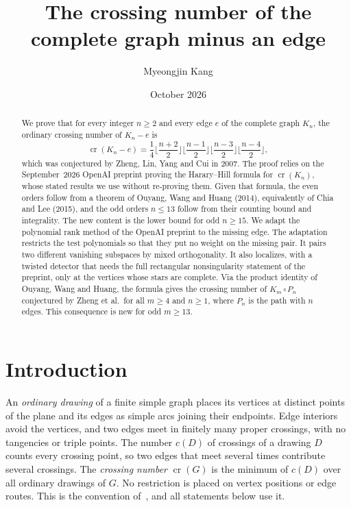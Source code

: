 \documentclass[11pt,a4paper]{article}
\title{The crossing number of the complete graph minus an edge}
\author{Myeongjin Kang}
\date{October 2026}
\theoremstyle{definition}
\theoremstyle{remark}
\numberwithin{equation}{section}
\newcommand{\crn}{\operatorname{cr}}
\begin{document}
\maketitle

\begin{abstract}
We prove that for every integer $n\ge 2$ and every edge $e$ of the complete graph $K_n$, the ordinary crossing number of $K_n-e$ is
\[
\crn(K_n-e)=\frac14\Big\lfloor\frac{n+2}{2}\Big\rfloor\Big\lfloor\frac{n-1}{2}\Big\rfloor\Big\lfloor\frac{n-3}{2}\Big\rfloor\Big\lfloor\frac{n-4}{2}\Big\rfloor ,
\]
which was conjectured by Zheng, Lin, Yang and Cui in 2007. The proof relies on the September~2026 OpenAI preprint proving the Harary--Hill formula for $\crn(K_n)$, whose stated results we use without re-proving them. Given that formula, the even orders follow from a theorem of Ouyang, Wang and Huang (2014), equivalently of Chia and Lee (2015), and the odd orders $n\le 13$ follow from their counting bound and integrality. The new content is the lower bound for odd $n\ge 15$. We adapt the polynomial rank method of the OpenAI preprint to the missing edge. The adaptation restricts the test polynomials so that they put no weight on the missing pair. It pairs two different vanishing subspaces by mixed orthogonality. It also localizes, with a twisted detector that needs the full rectangular nonsingularity statement of the preprint, only at the vertices whose stars are complete. Via the product identity of Ouyang, Wang and Huang, the formula gives the crossing number of $K_m\,\square\,P_n$ conjectured by Zheng et al.\ for all $m\ge 4$ and $n\ge 1$, where $P_n$ is the path with $n$ edges. This consequence is new for odd $m\ge 13$.
\end{abstract}

\section{Introduction}\label{sec:intro}

An \emph{ordinary drawing} of a finite simple graph places its vertices at distinct points of the plane and its edges as simple arcs joining their endpoints. Edge interiors avoid the vertices, and two edges meet in finitely many proper crossings, with no tangencies or triple points. The number $c(D)$ of crossings of a drawing $D$ counts every crossing point, so two edges that meet several times contribute several crossings. The \emph{crossing number} $\crn(G)$ is the minimum of $c(D)$ over all ordinary drawings of $G$. No restriction is placed on vertex positions or edge routes. This is the convention of~\cite[Section~1]{OAIKn}, and all statements below use it.
\end{document}
